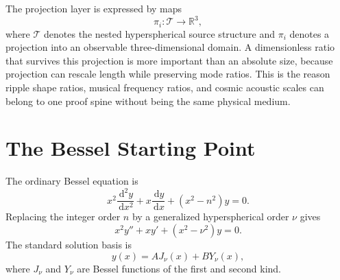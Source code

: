 \documentclass[11pt,a4paper]{article}
\renewcommand{\boxed}[1]{#1}
\newcommand{\dd}{\,\mathrm{d}}
\begin{document}
The projection layer is expressed by maps
\begin{equation}
\pi_i:\mathcal{T}\longrightarrow\mathbb{R}^3,
\label{eq:projection-map}
\end{equation}
where $\mathcal{T}$ denotes the nested hyperspherical source structure and $\pi_i$ denotes a projection into an observable three-dimensional domain. A dimensionless ratio that survives this projection is more important than an absolute size, because projection can rescale length while preserving mode ratios. This is the reason ripple shape ratios, musical frequency ratios, and cosmic acoustic scales can belong to one proof spine without being the same physical medium.

\section{The Bessel Starting Point}

The ordinary Bessel equation is
\begin{equation}
 x^2\frac{\dd^2 y}{\dd x^2}+x\frac{\dd y}{\dd x}+(x^2-n^2)y=0.
\label{eq:bessel-n}
\end{equation}
Replacing the integer order $n$ by a generalized hyperspherical order $\nu$ gives
\begin{equation}
\boxed{x^2y''+xy'+(x^2-\nu^2)y=0.}
\label{eq:bessel-nu}
\end{equation}
The standard solution basis is
\begin{equation}
 y(x)=A J_\nu(x)+B Y_\nu(x),
\label{eq:bessel-solutions}
\end{equation}
where $J_\nu$ and $Y_\nu$ are Bessel functions of the first and second kind.
\end{document}
